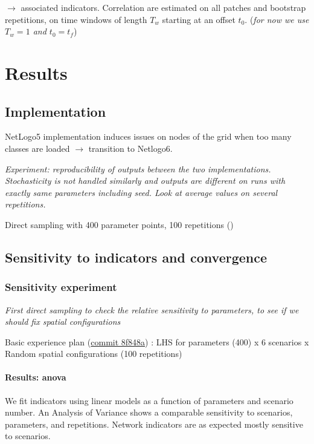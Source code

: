 $\rightarrow$ associated indicators. Correlation are estimated on all patches and bootstrap repetitions, on time windows of length $T_w$ starting at an offset $t_0$. (\textit{for now we use $T_w = 1$ and $t_0 = t_f$})



\section{Results}


\subsection{Implementation}

NetLogo5 implementation induces issues on nodes of the grid when too many classes are loaded $\rightarrow$ transition to Netlogo6.

\textit{Experiment: reproducibility of outputs between the two implementations. Stochasticity is not handled similarly and outputs are different on runs with exactly same parameters including seed. Look at average values on several repetitions.}

Direct sampling with 400 parameter points, 100 repetitions ()


\subsection{Sensitivity to indicators and convergence}

\subsubsection{Sensitivity experiment}

\textit{First direct sampling to check the relative sensitivity to parameters, to see if we should fix spatial configurations}

Basic experience plan (\href{https://github.com/JusteRaimbault/Governance/commit/8f848a20abca8c51b927e18c1aaf1ad3434af2cb}{commit 8f848a}) :
LHS for parameters (400) x 6 scenarios x Random spatial configurations (100 repetitions)


\paragraph{Results: anova}

We fit indicators using linear models as a function of parameters and scenario number. An Analysis of Variance shows a comparable sensitivity to scenarios, parameters, and repetitions. Network indicators are as expected mostly sensitive to scenarios.


